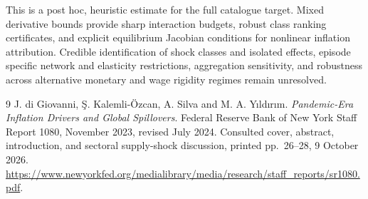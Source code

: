 \documentclass[11pt]{article}
\theoremstyle{remark}
\begin{document}
This is a post hoc, heuristic estimate for the full catalogue target.
Mixed derivative bounds provide sharp interaction budgets, robust class ranking certificates, and explicit equilibrium Jacobian conditions for nonlinear inflation attribution. Credible identification of shock classes and isolated effects, episode specific network and elasticity restrictions, aggregation sensitivity, and robustness across alternative monetary and wage rigidity regimes remain unresolved.

\begin{thebibliography}{9}
 J. di Giovanni, \c{S}. Kalemli-\"Ozcan, A. Silva and
M. A. Y\i ld\i r\i m. \emph{Pandemic-Era Inflation Drivers and Global
Spillovers}. Federal Reserve Bank of New York Staff Report 1080,
November 2023, revised July 2024. Consulted cover, abstract, introduction,
and sectoral supply-shock discussion, printed pp.~26--28, 9 October 2026.
\url{https://www.newyorkfed.org/medialibrary/media/research/staff_reports/sr1080.pdf}.
\end{thebibliography}
\end{document}
